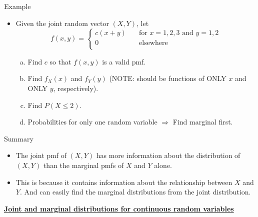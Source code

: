 \documentclass{article}
\newcommand{\bu}[1]{\textbf{\ul{#1}}}				%
\begin{document}
Example\bigskip
\begin{itemize}
    \item Given the joint random vector $(X,Y)$, let
   \[
    f(x,y) =
        \left\{
        \begin{array}{ll}
            c(x + y) & \quad \text{for } x = 1, 2, 3 \text{ and } y = 1, 2\\
            0 & \quad\text{elsewhere}\\
        \end{array}
        \right.
    \]
    \begin{enumerate}[(a)]
        \item Find $c$ so that $f(x,y)$ is a valid pmf.\vspace{150pt}
        \item Find $f_X(x)$ and $f_Y(y)$ (NOTE: should be functions of ONLY $x$ and ONLY $y$, respectively).\vspace{110pt}
        \item Find $P(X \le 2)$.
        \item[] Probabilities for only one random variable  $\Longrightarrow$ Find marginal first.\vspace{30pt}
    \end{enumerate}
\end{itemize}\bigskip

Summary\bigskip
\begin{itemize}
    \item The joint pmf of $(X,Y)$ has more information about the distribution of $(X,Y)$ than the marginal pmfs of $X$ and $Y$ alone.
    \item[] This is because it contains information about the relationship between $X$ and $Y$. And can easily find the marginal distributions from the joint distribution.
\end{itemize}\bigskip

\bu{Joint and marginal distributions for continuous random variables}\bigskip
\end{document}
